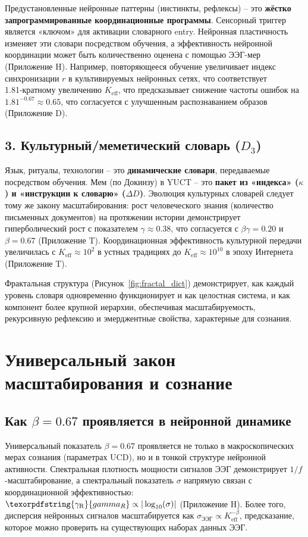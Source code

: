 \documentclass[12pt,a4paper]{article}
\DeclareRobustCommand{\gaR}{\texorpdfstring{\ensuremath{\gamma_{\mathrm{R}}}}{gamma_R}}
\newcommand{\eff}{\mathrm{eff}}
\newcommand{\Ke}{K_{\eff}}
\begin{document}
	Предустановленные нейронные паттерны (инстинкты, рефлексы) – это \textbf{жёстко запрограммированные координационные программы}. Сенсорный триггер является «ключом» для активации словарного entry. Нейронная пластичность изменяет эти словари посредством обучения, а эффективность нейронной координации может быть количественно оценена с помощью ЭЭГ-мер (Приложение H). Например, повторяющееся обучение увеличивает индекс синхронизации $r$ в культивируемых нейронных сетях, что соответствует 1.81‑кратному увеличению $\Ke$, что предсказывает снижение частоты ошибок на $1.81^{-0.67} \approx 0.65$, что согласуется с улучшенным распознаванием образов (Приложение D).
	
	\subsection{3. Культурный/меметический словарь ($D_3$)}
	
	Язык, ритуалы, технологии – это \textbf{динамические словари}, передаваемые посредством обучения. Мем (по Докинзу) в YUCT – это \textbf{пакет из «индекса» ($\kappa$) и «инструкции к словарю» ($\Delta D$)}. Эволюция культурных словарей следует тому же закону масштабирования: рост человеческого знания (количество письменных документов) на протяжении истории демонстрирует гиперболический рост с показателем $\gamma \approx 0.38$, что согласуется с $\beta\gamma = 0.20$ и $\beta = 0.67$ (Приложение T). Координационная эффективность культурной передачи увеличилась с $\Ke \approx 10^2$ в устных традициях до $\Ke \approx 10^{10}$ в эпоху Интернета (Приложение T).
	
	Фрактальная структура (Рисунок~\ref{fig:fractal_dict}) демонстрирует, как каждый уровень словаря одновременно функционирует и как целостная система, и как компонент более крупной иерархии, обеспечивая масштабируемость, рекурсивную рефлексию и эмерджентные свойства, характерные для сознания.
	
	\section{Универсальный закон масштабирования и сознание}
	
	\subsection{Как $\beta = 0.67$ проявляется в нейронной динамике}
	
	Универсальный показатель $\beta = 0.67$ проявляется не только в макроскопических мерах сознания (параметрах UCD), но и в тонкой структуре нейронной активности. Спектральная плотность мощности сигналов ЭЭГ демонстрирует $1/f$-масштабирование, а спектральный показатель $\sigma$ напрямую связан с координационной эффективностью: $\gaR \propto |\log_{10}(\sigma)|$ (Приложение H). Более того, дисперсия нейронных сигналов масштабируется как $\sigma_{\text{ЭЭГ}} \propto \Ke^{-\beta}$, предсказание, которое можно проверить на существующих наборах данных ЭЭГ.
	
\end{document}
